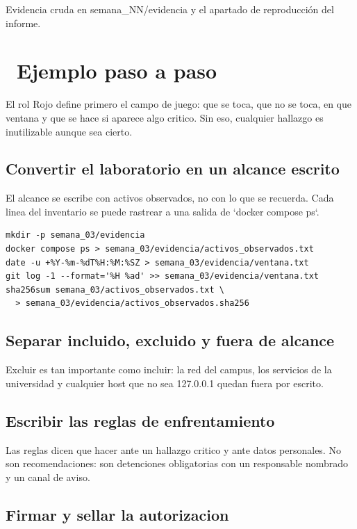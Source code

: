 \documentclass[11pt,a4paper]{article}
\newcommand{\iconotexto}[2]{\textcolor{cyanNeon}{\faIcon{#1}}~#2}
\begin{document}
Evidencia cruda en semana\_NN/evidencia y el apartado de reproducción del informe.

\section{\iconotexto{list-ol}{Ejemplo paso a paso}}

El rol Rojo define primero el campo de juego: que se toca, que no se toca, en que ventana y que se hace si aparece algo critico. Sin eso, cualquier hallazgo es inutilizable aunque sea cierto.

\subsection{Convertir el laboratorio en un alcance escrito}

El alcance se escribe con activos observados, no con lo que se recuerda. Cada linea del inventario se puede rastrear a una salida de `docker compose ps`.

\begin{lstlisting}[style=estiloCodigo]
mkdir -p semana_03/evidencia
docker compose ps > semana_03/evidencia/activos_observados.txt
date -u +%Y-%m-%dT%H:%M:%SZ > semana_03/evidencia/ventana.txt
git log -1 --format='%H %ad' >> semana_03/evidencia/ventana.txt
sha256sum semana_03/activos_observados.txt \
  > semana_03/evidencia/activos_observados.sha256
\end{lstlisting}

\subsection{Separar incluido, excluido y fuera de alcance}

Excluir es tan importante como incluir: la red del campus, los servicios de la universidad y cualquier host que no sea 127.0.0.1 quedan fuera por escrito.

\subsection{Escribir las reglas de enfrentamiento}

Las reglas dicen que hacer ante un hallazgo critico y ante datos personales. No son recomendaciones: son detenciones obligatorias con un responsable nombrado y un canal de aviso.

\subsection{Firmar y sellar la autorizacion}
\end{document}
